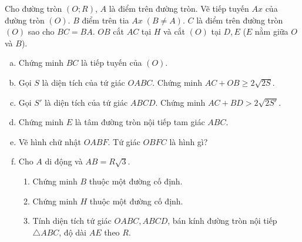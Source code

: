 	
\begin{bt}%
	Cho đường tròn $(O; R)$, $A$ là điểm trên đường tròn. Vẽ tiếp tuyến $Ax$ của đường tròn $(O)$. $B$ điểm trên tia $Ax\; (B\ne A)$. $C$ là điểm trên đường tròn $(O)$ sao cho $BC = BA$. $OB$ cắt $AC$ tại $H$ và cắt $(O)$ tại $D, E$ ($E$ nằm giữa $O$ và $B$).
	\begin{enumerate}[a)]
		\item Chứng minh $BC$ là tiếp tuyến của $(O)$.
		\item Gọi $S$ là diện tích của tứ giác $OABC$. Chứng minh $AC + OB \geq 2\sqrt{2S}$.
		\item Gọi $S'$ là diện tích của tứ giác $ABCD$. Chứng minh $AC + BD> 2\sqrt{2S'}$.
		\item Chứng minh $E$ là tâm đường tròn nội tiếp tam giác $ABC$.
		\item Vẽ hình chữ nhật $OABF$. Tứ giác $OBFC$ là hình gì?
		\item Cho $A$ di động và $AB = R\sqrt{3}$.
		\begin{enumerate}[1)]
			\item Chứng minh $B$ thuộc một đường cố định.
			\item Chứng minh $H$ thuộc một đường cố định.
			\item Tính diện tích tứ giác $OABC, ABCD$, bán kính đường tròn nội tiếp $\triangle ABC$, độ dài $AE$ theo $R$.
		\end{enumerate}
		
	\end{enumerate}
\end{bt}

